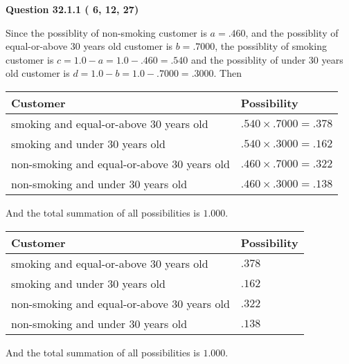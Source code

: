 \documentclass[12pt]{article}
\begin{document}
\vspace{0.2in}
  
{\textbf{\Large{Question
32.1.1 
 (          6,         12,         27)
}}}
  
  
 
 
\noindent{}

Since the possiblity of  %
 non-smoking customer is $ a =  %
.460 $,
and the possiblity of  %
equal-or-above 30 years old customer is $ b =  %
.7000 $,
the possiblity of  %
smoking customer is $ c = 1.0 - a = 1.0 -
.460
=  %
.540 $ and the possiblity of  %
under 30 years old
customer is $ d = 1.0 - b = 1.0 -  %
.7000 =  %
.3000  $.
Then
 
\noindent
\begin{tabular}{|l|l|}
\hline
Customer & Possibility \\
\hline
smoking  and  %
equal-or-above 30 years old  &
  $ %
.540 \times  %
.7000 =  %
.378$ \\
\hline
smoking  and  %
under 30 years old &
  $ %
.540 \times  %
.3000 =  %
.162$ \\
\hline
 non-smoking and  %
equal-or-above 30 years old  &
  $ %
.460 \times  %
.7000 =  %
.322$ \\
\hline
 non-smoking and  %
under 30 years old &
  $ %
.460 \times  %
.3000 =  %
.138$ \\
\hline
\end{tabular}
 
\noindent
And the total summation of all possibilities is $  %
1.000 $.
 
 
 
 
 
 
\noindent{}

 
\noindent
\begin{tabular}{|l|l|}
\hline
Customer & Possibility \\
\hline
smoking  and  %
equal-or-above 30 years old &
  $ %
.378$ \\
\hline
smoking  and  %
under 30 years old &
  $ %
.162$ \\
\hline
 non-smoking and  %
equal-or-above 30 years old &
  $ %
.322$ \\
\hline
 non-smoking and  %
under 30 years old &
  $ %
.138$ \\
\hline
\end{tabular}
 
\noindent
 And the total summation of all possibilities is $  %
1.000 $.
 
\end{document}

